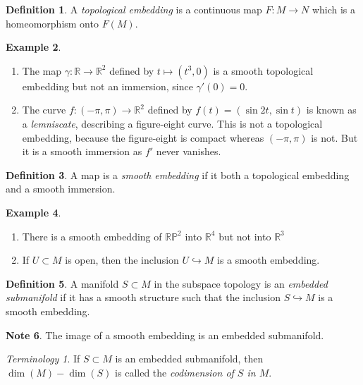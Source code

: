 \documentclass[10pt,letterpaper,cm]{nupset}
\theoremstyle{definition}
\newtheorem{definition}{Definition}[subsection]
\newtheorem{exmp}[definition]{Example}
\newtheorem{note}[definition]{Note}
\theoremstyle{theorem}
\theoremstyle{remark}
\newtheorem*{term}{Terminology}
\newcommand{\R}{\mathbb R}
\newcommand{\RP}{\mathbb{RP}}
\newcommand{\1}{\mathbf{1}}
\newcommand{\0}{\vec 0}
\begin{document}
\begin{definition}
A \textit{topological embedding} is a continuous map $F: M \to N$ which is a homeomorphism onto $F(M)$.
\end{definition}

\begin{exmp} $ $
\begin{enumerate}
\item The map $\gamma: \R \to \R^2$ defined by $t\mapsto \left(t^3, 0\right)$ is a smooth topological embedding but not an immersion, since $\gamma'(0) =0$.
\item The curve $f: \left({-\pi}, \pi\right) \to \R^2$ defined by $f(t) = \left(\sin 2t , \sin t\right)$ is known as a \textit{lemniscate}, describing a figure-eight curve. This is not a topological embedding, because the figure-eight is compact whereas $\left({-\pi}, \pi\right)$ is not. But it is a smooth immersion as $f'$ never vanishes. 
\end{enumerate}
\end{exmp}

\begin{definition}
A map is a \textit{smooth embedding} if it both a topological embedding and a smooth immersion.
\end{definition}

\begin{exmp} $ $
\begin{enumerate}
\item There is a smooth embedding of $\RP^2$ into $\R^4$ but not into $\R^3$
\item If $U \subset M$ is open, then the inclusion $U \hookrightarrow M$ is a smooth embedding.
\end{enumerate}
\end{exmp}

\begin{definition}
A manifold $ S\subset M$ in the subspace topology is an \textit{embedded submanifold} if it has a smooth structure such that the inclusion $S \hookrightarrow M$ is a smooth embedding.
\end{definition}

\begin{note}
The image of a smooth embedding is an embedded submanifold.
\end{note}

\begin{term}
If $S \subset M$ is an embedded submanifold, then $\dim(M) - \dim(S)$ is called the \textit{codimension of $S$ in $M$}.
\end{term}
\end{document}
